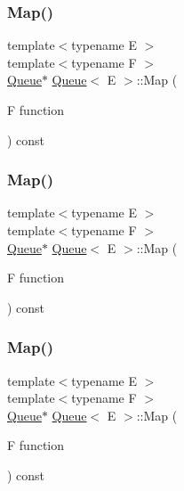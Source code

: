 \mbox{\label{class_queue_a904a696292fc593adc6fd21fb229d760}} 
\subsubsection{\texorpdfstring{Map()}{Map()}\hspace{0.1cm}{\footnotesize\ttfamily [1/3]}}
{\footnotesize\ttfamily template$<$typename E $>$ \\
template$<$typename F $>$ \\
\mbox{\hyperlink{class_queue}{Queue}}$\ast$ \mbox{\hyperlink{class_queue}{Queue}}$<$ E $>$\+::Map (\begin{DoxyParamCaption}\item[{F}]{function }\end{DoxyParamCaption}) const\hspace{0.3cm}{\ttfamily [inline]}}

\mbox{\label{class_queue_a904a696292fc593adc6fd21fb229d760}} 
\subsubsection{\texorpdfstring{Map()}{Map()}\hspace{0.1cm}{\footnotesize\ttfamily [2/3]}}
{\footnotesize\ttfamily template$<$typename E $>$ \\
template$<$typename F $>$ \\
\mbox{\hyperlink{class_queue}{Queue}}$\ast$ \mbox{\hyperlink{class_queue}{Queue}}$<$ E $>$\+::Map (\begin{DoxyParamCaption}\item[{F}]{function }\end{DoxyParamCaption}) const\hspace{0.3cm}{\ttfamily [inline]}}

\mbox{\label{class_queue_a904a696292fc593adc6fd21fb229d760}} 
\subsubsection{\texorpdfstring{Map()}{Map()}\hspace{0.1cm}{\footnotesize\ttfamily [3/3]}}
{\footnotesize\ttfamily template$<$typename E $>$ \\
template$<$typename F $>$ \\
\mbox{\hyperlink{class_queue}{Queue}}$\ast$ \mbox{\hyperlink{class_queue}{Queue}}$<$ E $>$\+::Map (\begin{DoxyParamCaption}\item[{F}]{function }\end{DoxyParamCaption}) const\hspace{0.3cm}{\ttfamily [inline]}}

